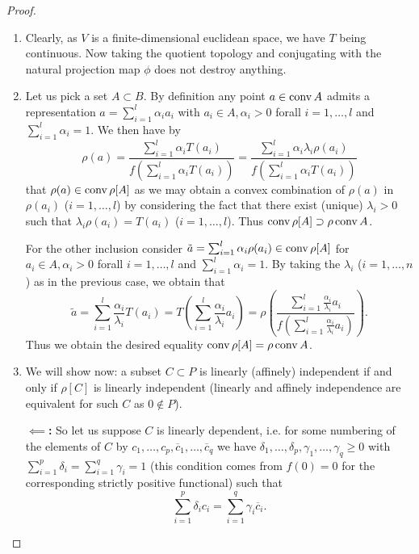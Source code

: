 \documentclass{article}
\begin{document}
\begin{proof}
\begin{enumerate}
\item Clearly, as $V$ is a finite-dimensional euclidean space, we have $T$ being continuous. Now taking the quotient topology and conjugating with the natural projection map $\phi$ does not destroy anything. 
\item Let us pick a set $A\subset B$. By definition any point $a\in\operatorname{conv} A$ admits a representation $a=\sum_{i=1}^l{\alpha_i a_i}$ with $a_i\in A, \alpha_i>0$ forall $i=1,\ldots,l$ and $\sum_{i=1}^l{\alpha_i}=1$. We then have by 
\begin{equation}
\rho(a)=\frac{\sum_{i=1}^l{\alpha_i T(a_i)}}{f\left(\sum_{i=1}^l{\alpha_i T(a_i)}\right)}=\frac{\sum_{i=1}^l{\alpha_i\lambda_i\rho(a_i)}}{f\left(\sum_{i=1}^l{\alpha_i T(a_i)}\right)}\label{eq1}
\end{equation}
that $\rho(a)\in\operatorname{conv}\rho[A]$ as we may obtain a convex combination of $\rho(a)$ in $\rho(a_i)$ ($i=1,\ldots,l$) by considering the fact that there exist (unique) $\lambda_i>0$ such that $\lambda_i\rho(a_i)=T(a_i)$ ($i=1,\ldots,l$). Thus $\operatorname{conv}\rho[A]\supset\rho\operatorname{conv} A$.

For the other inclusion consider $\tilde{a}=\sum_{i=1}^l{\alpha_i \rho(a_i)}\in\operatorname{conv}\rho[A]$ for $a_i\in A, \alpha_i>0$ forall $i=1,\ldots,l$ and $\sum_{i=1}^l{\alpha_i}=1$. By taking the $\lambda_i$ ($i=1,\ldots,n$) as in the previous case, we obtain that
\begin{equation}
\tilde{a}=\sum_{i=1}^l{\frac{\alpha_i}{\lambda_i} T(a_i)}=T\left(\sum_{i=1}^l{\frac{\alpha_i}{\lambda_i} a_i}\right)=\rho\left(\frac{\sum_{i=1}^l{\frac{\alpha_i}{\lambda_i} a_i}}{f\left(\sum_{i=1}^l{\frac{\alpha_i}{\lambda_i} a_i}\right)}\right)\text{.}\label{eq2}
\end{equation}
Thus we obtain the desired equality $\operatorname{conv}\rho[A]=\rho\operatorname{conv} A$.
\item We will show now: a subset $C\subset P$ is linearly (affinely) independent if and only if $\rho[C]$ is linearly independent (linearly and affinely independence are equivalent for such $C$ as $0\not\in P$).

\textbf{$\impliedby$:} So let us suppose $C$ is linearly dependent, i.e. for some numbering of the elements of $C$ by $c_1,\ldots,c_p,\overline{c}_1,\ldots,\overline{c}_q$ we have $\delta_1,\ldots,\delta_p,\gamma_1,\ldots,\gamma_q\geq 0$ with $\sum_{i=1}^p{\delta_i}=\sum_{i=1}^q{\gamma_i}=1$ (this condition comes from $f(0)=0$ for the corresponding strictly positive functional) such that 
\begin{equation}
\sum_{i=1}^p{\delta_i c_i}=\sum_{i=1}^q{\gamma_i \overline{c}_i}\text{.}\label{eq3}
\end{equation}


\end{enumerate}
\end{proof}
\end{document}
